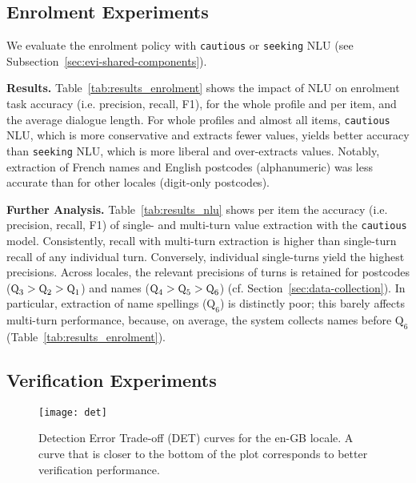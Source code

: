 \documentclass[11pt]{article}
\newcommand{\rparagraph}[1]{\vspace{1.4mm}\noindent\textbf{#1.}}
\begin{document}
{\subsection{Enrolment Experiments}
\label{sec:enrolment-experiments}


We evaluate the enrolment policy with \texttt{cautious} or \texttt{seeking} NLU (see Subsection~\ref{sec:evi-shared-components}).

\rparagraph{Results} Table~\ref{tab:results_enrolment} shows the impact of NLU
on enrolment task accuracy (i.e. precision, recall, F1),
for the whole profile and per item,
and the average dialogue length.
For whole profiles and almost all items,
\texttt{cautious} NLU,
which is more conservative and extracts fewer values,
yields better accuracy than
\texttt{seeking} NLU,
which is more liberal and over-extracts values.
Notably,
extraction of French names and English postcodes (alphanumeric)
was less accurate than for other locales (digit-only postcodes).


\rparagraph{Further Analysis} Table~\ref{tab:results_nlu}
shows {per item the accuracy} (i.e. precision, recall, F1)
of single- and multi-turn value extraction with the \texttt{cautious} model.
Consistently,
recall with multi-turn extraction
is higher than
single-turn recall of any individual turn.
Conversely,
individual single-turns yield the highest precisions.
Across locales,
the relevant precisions of turns
is retained for postcodes ($\small\text{Q}_{3}>\text{Q}_{2}>\text{Q}_{1}$) and 
names ($\small\text{Q}_{4}>\text{Q}_{5}>\text{Q}_{6}$)
(cf. Section~\ref{sec:data-collection}).
In particular,
extraction of name spellings ($\text{Q}_{6}$) is distinctly poor; this barely affects multi-turn performance,
because, on average, the system collects names before $\text{Q}_{6}$ (Table~\ref{tab:results_enrolment}).








\subsection{Verification Experiments}
\label{sec:verification-experiments}


\begin{figure}[t]
\centering
\texttt{[image: det]}
\caption{
    Detection Error Trade-off (DET) curves
    for the en-GB locale.
    A curve that is closer to the bottom of the plot
    corresponds to better verification performance.
}
\label{fig:det}
\end{figure}

}
\end{document}
